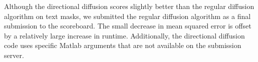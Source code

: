 Although the directional diffusion scores slightly better than the regular diffusion algorithm on text masks, we submitted the regular diffusion algorithm as a final submission to the scoreboard. The small decrease in mean squared error is offset by a relatively large increase in runtime. Additionally, the directional diffusion code uses specific Matlab arguments that are not available on the submission server.